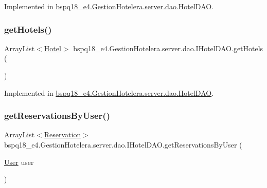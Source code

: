 Implemented in \mbox{\hyperlink{classbspq18__e4_1_1_gestion_hotelera_1_1server_1_1dao_1_1_hotel_d_a_o_a3a9284db5b9ee5ed0ac1cb126c2150cf}{bspq18\+\_\+e4.\+Gestion\+Hotelera.\+server.\+dao.\+Hotel\+D\+AO}}.

\mbox{\label{interfacebspq18__e4_1_1_gestion_hotelera_1_1server_1_1dao_1_1_i_hotel_d_a_o_a025324d204edaa7c021c6eed22804882}} 
\subsubsection{\texorpdfstring{get\+Hotels()}{getHotels()}}
{\footnotesize\ttfamily Array\+List$<$\mbox{\hyperlink{classbspq18__e4_1_1_gestion_hotelera_1_1server_1_1data_1_1_hotel}{Hotel}}$>$ bspq18\+\_\+e4.\+Gestion\+Hotelera.\+server.\+dao.\+I\+Hotel\+D\+A\+O.\+get\+Hotels (\begin{DoxyParamCaption}{ }\end{DoxyParamCaption})}



Implemented in \mbox{\hyperlink{classbspq18__e4_1_1_gestion_hotelera_1_1server_1_1dao_1_1_hotel_d_a_o_a4dd881c70a7ac298606f02bfc5824422}{bspq18\+\_\+e4.\+Gestion\+Hotelera.\+server.\+dao.\+Hotel\+D\+AO}}.

\mbox{\label{interfacebspq18__e4_1_1_gestion_hotelera_1_1server_1_1dao_1_1_i_hotel_d_a_o_afa1838e14526101d626d241da08c3b13}} 
\subsubsection{\texorpdfstring{get\+Reservations\+By\+User()}{getReservationsByUser()}}
{\footnotesize\ttfamily Array\+List$<$\mbox{\hyperlink{classbspq18__e4_1_1_gestion_hotelera_1_1server_1_1data_1_1_reservation}{Reservation}}$>$ bspq18\+\_\+e4.\+Gestion\+Hotelera.\+server.\+dao.\+I\+Hotel\+D\+A\+O.\+get\+Reservations\+By\+User (\begin{DoxyParamCaption}\item[{\mbox{\hyperlink{classbspq18__e4_1_1_gestion_hotelera_1_1server_1_1data_1_1_user}{User}}}]{user }\end{DoxyParamCaption})}



